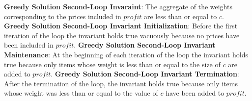 \documentclass[onecolumn, 12pt, article]{IEEEtran}
\numberwithin{case}{problem}
\numberwithin{condition}{problem}
\numberwithin{condition}{subsection}
\numberwithin{definition}{section}
\theoremstyle{remark}
\numberwithin{question}{problem}
\theoremstyle{plain}
\numberwithin{answer}{problem}
\numberwithin{solution}{section}
\numberwithin{equation}{section}%
\begin{document}
\newline
\newline
\textbf{Greedy Solution Second-Loop Invaraint}: The aggregate of the weights corresponding to the prices included in $profit$ are less than or equal to $c$.
\newline
\textbf{Greedy Solution Second-Loop Invariant Initialization}: Before the first iteration of the loop the invariant holds true vacuously because no prices have been included in $profit$.
\newline
\textbf{Greedy Solution Second-Loop Invariant Maintenance}: At the beginning of each iteration of the loop the invariant holds true because only items whose weight is less than or equal to the size of $c$ are added to $profit$.
\newline
\textbf{Greedy Solution Second-Loop Invariant Termination}: After the termination of the loop, the invariant holds true because only items whose weight was less than or equal to the value of $c$ have been added to $profit$.
\newline
\newline
\end{document}
